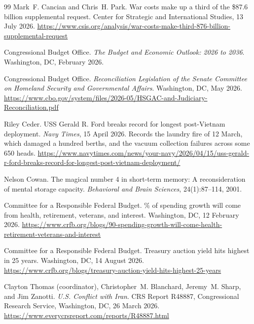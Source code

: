 \documentclass[11pt,a4paper]{article}
\theoremstyle{remark}
\begin{document}
\begin{thebibliography}{99}
Mark~F. Cancian and Chris~H. Park.
\newblock War costs make up a third of the \$87.6 billion supplemental request.
\newblock Center for Strategic and International Studies, 13 July 2026.
\newblock \url{https://www.csis.org/analysis/war-costs-make-third-876-billion-supplemental-request}


Congressional Budget Office.
\newblock \emph{The Budget and Economic Outlook: 2026 to 2036}.
\newblock Washington, DC, February 2026.

Congressional Budget Office.
\newblock \emph{Reconciliation Legislation of the Senate Committee on Homeland Security and Governmental Affairs}.
\newblock Washington, DC, May 2026.
\newblock \url{https://www.cbo.gov/system/files/2026-05/HSGAC-and-Judiciary-Reconciliation.pdf}

Riley Ceder.
\newblock USS Gerald R. Ford breaks record for longest post-Vietnam deployment.
\newblock \emph{Navy Times}, 15 April 2026. Records the laundry fire of 12 March, which damaged a
hundred berths, and the vacuum collection failures across some 650 heads.
\newblock \url{https://www.navytimes.com/news/your-navy/2026/04/15/uss-gerald-r-ford-breaks-record-for-longest-post-vietnam-deployment/}

Nelson Cowan.
\newblock The magical number 4 in short-term memory: A reconsideration of mental storage capacity.
\newblock \emph{Behavioral and Brain Sciences}, 24(1):87--114, 2001.

Committee for a Responsible Federal Budget.
\% of spending growth will come from health, retirement, veterans, and interest.
\newblock Washington, DC, 12 February 2026.
\newblock \url{https://www.crfb.org/blogs/90-spending-growth-will-come-health-retirement-veterans-and-interest}


Committee for a Responsible Federal Budget.
\newblock Treasury auction yield hits highest in 25 years.
\newblock Washington, DC, 14 August 2026.
\newblock \url{https://www.crfb.org/blogs/treasury-auction-yield-hits-highest-25-years}


Clayton Thomas (coordinator), Christopher~M. Blanchard, Jeremy~M. Sharp, and Jim Zanotti.
\newblock \emph{U.S. Conflict with Iran}.
\newblock CRS Report R48887, Congressional Research Service, Washington, DC, 26 March 2026.
\newblock \url{https://www.everycrsreport.com/reports/R48887.html}


\end{thebibliography}
\end{document}
